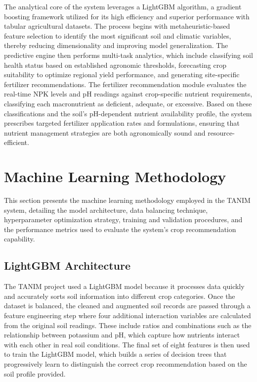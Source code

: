 {	The analytical core of the system leverages a LightGBM algorithm, a gradient boosting framework utilized for its high efficiency and superior performance with tabular agricultural datasets. The process begins with metaheuristic-based feature selection to identify the most significant soil and climatic variables, thereby reducing dimensionality and improving model generalization. The predictive engine then performs multi-task analytics, which include classifying soil health status based on established agronomic thresholds, forecasting crop suitability to optimize regional yield performance, and generating site-specific fertilizer recommendations. The fertilizer recommendation module evaluates the real-time NPK levels and pH readings against crop-specific nutrient requirements, classifying each macronutrient as deficient, adequate, or excessive. Based on these classifications and the soil's pH-dependent nutrient availability profile, the system prescribes targeted fertilizer application rates and formulations, ensuring that nutrient management strategies are both agronomically sound and resource-efficient.
	
	
	\section{Machine Learning Methodology}
	
	This section presents the machine learning methodology employed in the TANIM system, detailing the model architecture, data balancing technique, hyperparameter optimization strategy, training and validation procedures, and the performance metrics used to evaluate the system's crop recommendation capability.
	
	\subsection{LightGBM Architecture}
	The TANIM project used a LightGBM model because it processes data quickly and accurately sorts soil information into different crop categories. Once the dataset is balanced, the cleaned and augmented soil records are passed through a feature engineering step where four additional interaction variables are calculated from the original soil readings. These include ratios and combinations such as the relationship between potassium and pH, which capture how nutrients interact with each other in real soil conditions. The final set of eight features is then used to train the LightGBM model, which builds a series of decision trees that progressively learn to distinguish the correct crop recommendation based on the soil profile provided.
	
}
